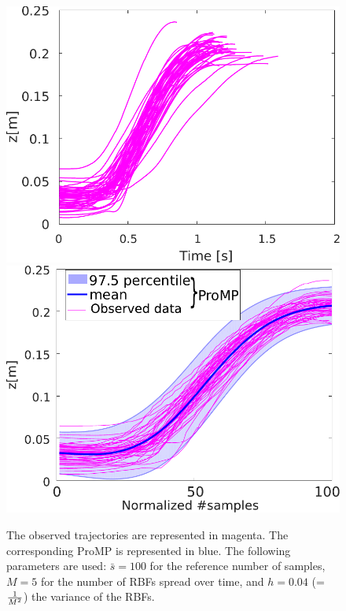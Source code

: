 \documentclass[utf8]{frontiersSCNS} %
\begin{document}
\begin{figure}[h]
\includegraphics[width=\hsize /2]{img/1DOFtrajectoriesV2.pdf} \includegraphics[width=\hsize /2]{img/1DOFtrajectoriesProMPV2.pdf}
\caption{The observed trajectories are represented in magenta. The corresponding ProMP is represented in blue. The following parameters are used: $\bar{s}=100$ for the reference number of samples, $M=5$ for the number of RBFs spread over time, and  $h=0.04$ (=$ 1 \over M^2$) the variance of the RBFs.}
\label{fig:1DOFtrajectoriesProMP}
\end{figure}

\end{document}
